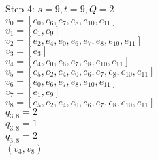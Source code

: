 Step 4:
$s=9,t=9,Q=2$\\
$v_{0}=[e_{0},e_{6},e_{7},e_{8},e_{10},e_{11}]$\\
$v_{1}=[e_{1},e_{9}]$\\
$v_{2}=[e_{2},e_{4},e_{0},e_{6},e_{7},e_{8},e_{10},e_{11}]$\\
$v_{3}=[e_{3}]$\\
$v_{4}=[e_{4},e_{0},e_{6},e_{7},e_{8},e_{10},e_{11}]$\\
$v_{5}=[e_{5},e_{2},e_{4},e_{0},e_{6},e_{7},e_{8},e_{10},e_{11}]$\\
$v_{6}=[e_{0},e_{6},e_{7},e_{8},e_{10},e_{11}]$\\
$v_{7}=[e_{1},e_{9}]$\\
$v_{8}=[e_{5},e_{2},e_{4},e_{0},e_{6},e_{7},e_{8},e_{10},e_{11}]$\\
$q_{3,8}=2$\\
$q_{3,8}=1$\\
$q_{3,8}=2$\\
$(v_{3},v_{8})$\\


